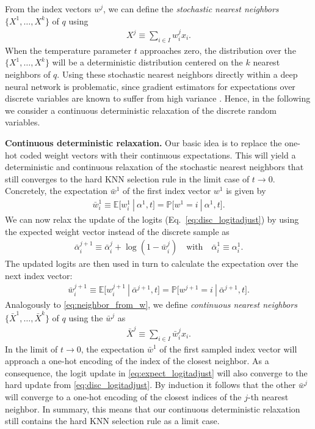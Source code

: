 \documentclass{article}
\newcommand{\myparagraph}[1]{\smallskip\noindent\textbf{#1}}
\newcommand\E{\mathbb{E}}
\newcommand\q{q}
\newcommand\kk{k}
\newcommand\db{x}
\newcommand\dbs{X}
\newcommand\mdbs{\bar{X}}
\newcommand\dbI{I}
\newcommand\prob{\mathbb{P}}
\newcommand\tcat{t}
\newcommand\logit{\alpha}
\newcommand\mlogit{\bar{\alpha}}
\newcommand\mw{\bar{w}}
\newcommand\w{w}
\newcommand\given{\ | \ }
\begin{document}
From the index vectors $\w^j$, we can define the \emph{stochastic nearest neighbors} $\{\dbs^1, \ldots, \dbs^\kk\}$ of $\q$ using
\begin{align}
\dbs^j \equiv \sum_{i \in \dbI} \w_i^j \db_i. \label{eq:neighbor_from_w}
\end{align}
When the temperature parameter $\tcat$ approaches zero, the distribution over
the $\{\dbs^{1},\dots,\dbs^{\kk}\}$ will be a deterministic distribution centered on the $\kk$ nearest neighbors of $\q$.
Using these stochastic nearest neighbors directly within a deep neural network is problematic, since gradient estimators for expectations over discrete variables are
known to suffer from high variance \cite{Mnih:2016:VIM}. 
Hence, in the following we consider a continuous deterministic relaxation of the discrete random variables.

\myparagraph{Continuous deterministic relaxation.} 
Our basic idea is to replace the one-hot coded weight vectors with their continuous expectations.
This will yield a deterministic and continuous relaxation of the stochastic nearest neighbors that still converges to the hard KNN selection rule in the limit case of $\tcat \to 0$.
Concretely, the expectation $\mw^{1}$ of the first index vector $\w^1$ is given by
\begin{align}
\mw^{1}_i \equiv \E\big[\w^{1}_i \given \logit^{1}, \tcat\big] = \prob\big[\w^{1} = i \given \logit^{1}, \tcat\big].  \label{eq:expect_sample_1}
\end{align}
We can now relax the update of the logits (Eq.~\ref{eq:disc_logitadjust}) by using the expected weight vector instead of the discrete sample as
\begin{align}
\mlogit^{j+1}_i \equiv \mlogit^{j}_i + \log(1- \mw^{j}_i) \quad\text{with}\quad \mlogit^{1}_i \equiv \logit^{1}_i. \label{eq:expect_logitadjust}
\end{align}
The updated logits are then used in turn to calculate the expectation over the next index vector:
\begin{align}
\mw^{j+1}_i \equiv \E\big[\w^{j+1}_i \given \mlogit^{j+1}, \tcat\big] =  \prob\big[\w^{j+1} = i \given \mlogit^{j+1}, \tcat\big].  \label{eq:expect_sample_i}
\end{align}
Analogously to \cref{eq:neighbor_from_w}, we define \emph{continuous nearest neighbors} $\{\mdbs^1,\ldots,\mdbs^\kk\}$ of $\q$ using the $\mw^j$ as
\begin{align}
\mdbs^j \equiv \sum_{i \in \dbI} \mw_i^j \db_i. \label{eq:expect_neighbor_from_w}
\end{align}
In the limit of $\tcat \to 0$, the expectation $\mw^1$ of the first sampled index vector will approach a one-hot encoding of the index of the closest neighbor. 
As a consequence, the logit update in \cref{eq:expect_logitadjust} will also converge to the hard update from \cref{eq:disc_logitadjust}.
By induction it follows that the other $\mw^{j}$ will converge to a one-hot encoding of the closest indices of the $j$-th nearest neighbor.
In summary, this means that our continuous deterministic relaxation still contains the hard KNN selection rule as a limit case.
\end{document}
